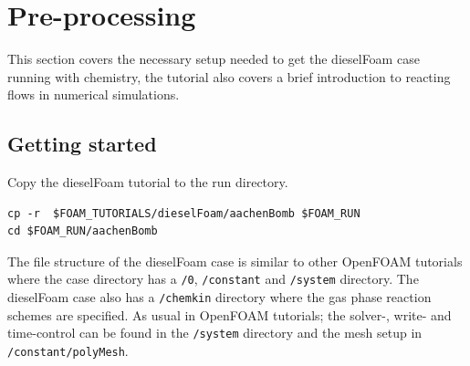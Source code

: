 \documentclass{report}
\begin{document}
\section{Pre-processing}
This section covers the necessary setup needed to get the dieselFoam case running with chemistry, the tutorial also covers a brief introduction to reacting flows in numerical simulations.

\subsection{Getting started}
Copy the dieselFoam tutorial to the run directory. 
\begin{verbatim}
cp -r  $FOAM_TUTORIALS/dieselFoam/aachenBomb $FOAM_RUN
cd $FOAM_RUN/aachenBomb
\end{verbatim}
The file structure of the dieselFoam case is similar to other OpenFOAM tutorials where the case directory has a \verb+/0+, \verb+/constant+ and \verb+/system+ directory. The dieselFoam case also has a \verb+/chemkin+ directory where the gas phase reaction schemes are specified. As usual in OpenFOAM tutorials; the solver-, write- and time-control can be found in the \verb+/system+ directory and the mesh setup in \verb+/constant/polyMesh+. 
\end{document}

